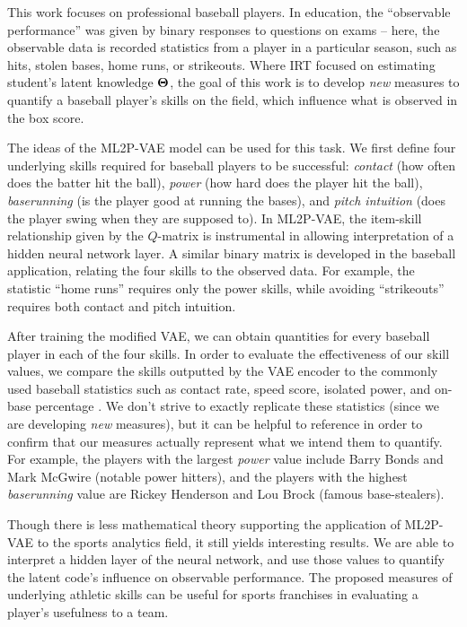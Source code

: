 This work focuses on professional baseball players. In education, the ``observable performance'' was given by binary responses to questions on exams -- here, the observable data is recorded statistics from a player in a particular season, such as hits, stolen bases, home runs, or strikeouts. Where IRT focused on estimating student's latent knowledge $\boldsymbol{\Theta}$, the goal of this work is to develop \textit{new} measures to quantify a baseball player's skills on the field, which influence what is observed in the box score.

The ideas of the ML2P-VAE model can be used for this task. We first define four underlying skills required for baseball players to be successful: \textit{contact} (how often does the batter hit the ball), \textit{power} (how hard does the player hit the ball), \textit{baserunning} (is the player good at running the bases), and \textit{pitch intuition} (does the player swing when they are supposed to). In ML2P-VAE, the item-skill relationship given by the $Q$-matrix is instrumental in allowing interpretation of a hidden neural network layer. A similar binary matrix is developed in the baseball application, relating the four skills to the observed data. For example, the statistic ``home runs'' requires only the power skills, while avoiding ``strikeouts'' requires both contact and pitch intuition.

After training the modified VAE, we can obtain quantities for every baseball player in each of the four skills. In order to evaluate the effectiveness of our skill values, we compare the skills outputted by the VAE encoder to the commonly used baseball statistics such as contact rate, speed score, isolated power, and on-base percentage \cite{baseball_reference}. We don't strive to exactly replicate these statistics (since we are developing \textit{new} measures), but it can be helpful to reference in order to confirm that our measures actually represent what we intend them to quantify. For example, the players with the largest \textit{power} value include Barry Bonds and Mark McGwire (notable power hitters), and the players with the highest \textit{baserunning} value are Rickey Henderson and Lou Brock (famous base-stealers).

Though there is less mathematical theory supporting the application of ML2P-VAE to the sports analytics field, it still yields interesting results. We are able to interpret a hidden layer of the neural network, and use those values to quantify the latent code's influence on observable performance. The proposed measures of underlying athletic skills can be useful for sports franchises in evaluating a player's usefulness to a team.

